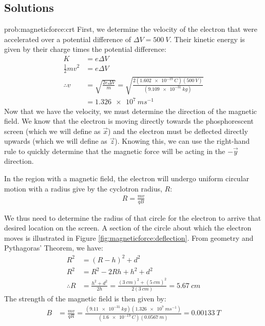\newpage
\subsection{Solutions}
\begin{solution}{prob:magneticforce:crt}\label{soln:magneticforce:crt}
First, we determine the velocity of the electron that were accelerated over a potential difference of $\Delta V=\SI{500}{V}$. Their kinetic energy is given by their charge times the potential difference:
\begin{align*}
K &= e\Delta V \\
\frac{1}{2} mv^2 &= e\Delta V\\
\therefore v &= \sqrt{\frac{2e\Delta V}{m}}= \sqrt{\frac{2(\SI{1.602e-19}{C})(\SI{500}{V})}{(\SI{9.109e-31}{kg})}}\\
 &= \SI{1.326e7}{ms^{-1}}
\end{align*}
Now that we have the velocity, we must determine the direction of the magnetic field. We know that the electron is moving directly towards the phosphorescent screen (which we will define as $\vec x$) and the electron must be deflected directly upwards (which we will define as $\vec z$). Knowing this, we can use the right-hand rule to quickly determine that the magnetic force will be acting in the $-\vec y$ direction. 

In the region with a magnetic field, the electron will undergo uniform circular motion with a radius give by the cyclotron radius, $R$:
\begin{align*}
R=\frac{mv}{qB}
\end{align*}

We thus need to determine the radius of that circle for the electron to arrive that desired location on the screen. A section of the circle about which the electron moves is illustrated in Figure \ref{fig:magneticforce:deflection}.
From geometry and Pythagoras' Theorem, we have:
\begin{align*}
R^2 &= (R-h)^2+d^2\\
R^2 &= R^2-2Rh+h^2+d^2\\
\therefore R &= \frac{h^2+d^2}{2h}=\frac{(\SI{3}{cm})^2+(\SI{5}{cm})^2}{2(\SI{3}{cm})}=\SI{5.67}{cm}
\end{align*}
The strength of the magnetic field is then given by:
\begin{align*}
B&=\frac{mv}{qR}=\frac{(\SI{9.11e-31}{kg})(\SI{1.326e7}{ms^{-1}})}{(\SI{1.6e-19}{C})(\SI{0.0567}{m})}=\SI{0.00133}{T}
\end{align*}
\end{solution}


